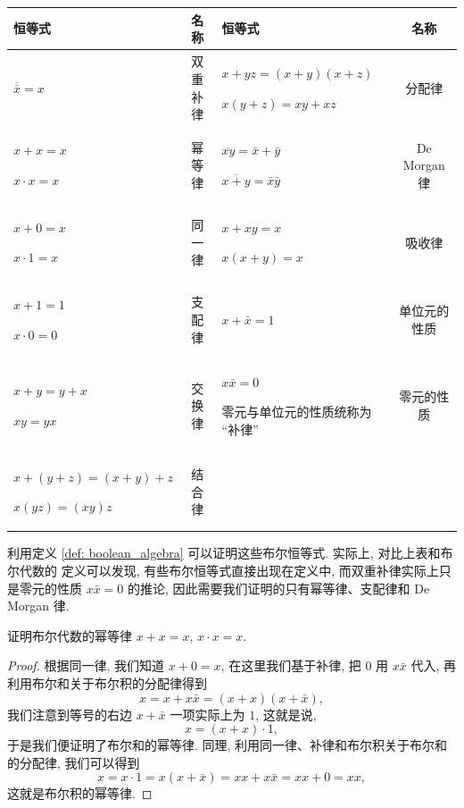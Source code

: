 \documentclass[10pt,UTF8]{book} %
\begin{document}
{ %
\label{布尔代数恒等式} %
\begin{longtable}{p{}|c||p{}|c}
    \toprule
    \textbf{恒等式} & \textbf{名称} & \textbf{恒等式} & \textbf{名称} \\

    \midrule
    \endhead
    \bottomrule
    \endfoot

        $\overline{\bar x} = x$ & 双重补律 & $x + yz = (x+y)(x+z)$
        
        $x(y+z) = xy+xz$& 分配律\\
        \hline
        $x+x = x$ 

        $x \cdot x = x$ & 幂等律 & $\overline{xy} = \bar x + \bar y$

        $\overline{x+y}=\bar x \bar y$ & De Morgan 律 \\ 
        \hline
        $x+0 = x$

        $x \cdot 1 = x$ & 同一律 & $x + xy=x$

        $x(x+y) = x$ & 吸收律 \\
        \hline 
        $x + 1 = 1$ 

        $x \cdot 0 = 0$ & 支配律 & $x + \bar x = 1$ & 单位元的性质 \\ 
        \hline 
        $x+y = y+x$

        $xy = yx$ & 交换律 & $x\bar x = 0$ 
        
        零元与单位元的性质统称为 “补律” & 零元的性质 \\ 
        \hline 
        $x+(y+z) = (x+y)+z$ 

        $x(yz) = (xy)z$ & 结合律 & & \\ 
\end{longtable}}

利用定义 \ref{def: boolean_algebra} 可以证明这些布尔恒等式. 实际上, 对比上表和布尔代数的
定义可以发现, 有些布尔恒等式直接出现在定义中, 而双重补律实际上只是零元的性质 $x \bar x = 0$
的推论, 因此需要我们证明的只有幂等律、支配律和 De Morgan 律.

\begin{example}
    证明布尔代数的幂等律 $x+x = x$, $x \cdot x = x$.
    \begin{proof}
        根据同一律, 我们知道 $x+0 = x$, 在这里我们基于补律, 把 $0$ 用 $x \bar x$ 代入,
        再利用布尔和关于布尔积的分配律得到
        \[ x = x + x \bar x = (x+x)(x + \bar x), \]
        我们注意到等号的右边 $x + \bar x$ 一项实际上为 $1$, 这就是说,
        \[ x = (x + x) \cdot 1, \]
        于是我们便证明了布尔和的幂等律. 同理, 利用同一律、补律和布尔积关于布尔和的分配律, 我们可以得到
        \[ x = x \cdot 1 = x (x + \bar x) = xx+x\bar x = xx + 0 = xx, \]
        这就是布尔积的幂等律.
    \end{proof}
\end{example}
\end{document}
